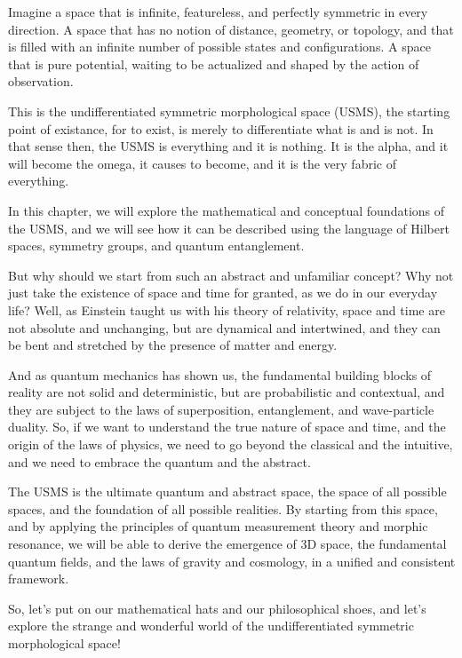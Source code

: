 Imagine a space that is infinite, featureless, and perfectly symmetric in every direction. A space that has no notion of distance, geometry, or topology, and that is filled with an infinite number of possible states and configurations. A space that is pure potential, waiting to be actualized and shaped by the action of observation.

This is the undifferentiated symmetric morphological space (USMS), the starting point of existance, for to exist, is merely to differentiate what is and is not. In that sense then, the USMS is everything and it is nothing. It is the alpha, and it will become the omega, it causes to become, and it is the very fabric of everything.

In this chapter, we will explore the mathematical and conceptual foundations of the USMS, and we will see how it can be described using the language of Hilbert spaces, symmetry groups, and quantum entanglement.

But why should we start from such an abstract and unfamiliar concept? Why not just take the existence of space and time for granted, as we do in our everyday life? Well, as Einstein taught us with his theory of relativity, space and time are not absolute and unchanging, but are dynamical and intertwined, and they can be bent and stretched by the presence of matter and energy.

And as quantum mechanics has shown us, the fundamental building blocks of reality are not solid and deterministic, but are probabilistic and contextual, and they are subject to the laws of superposition, entanglement, and wave-particle duality. So, if we want to understand the true nature of space and time, and the origin of the laws of physics, we need to go beyond the classical and the intuitive, and we need to embrace the quantum and the abstract.

The USMS is the ultimate quantum and abstract space, the space of all possible spaces, and the foundation of all possible realities. By starting from this space, and by applying the principles of quantum measurement theory and morphic resonance, we will be able to derive the emergence of 3D space, the fundamental quantum fields, and the laws of gravity and cosmology, in a unified and consistent framework.

So, let's put on our mathematical hats and our philosophical shoes, and let's explore the strange and wonderful world of the undifferentiated symmetric morphological space!

